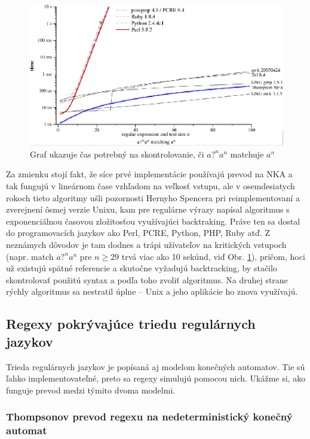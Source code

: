 \begin{figure}[h]
  \centering
  \includegraphics[width=1\textwidth]{obrazky/graf}
  \caption{Graf ukazuje čas potrebný na skontrolovanie, či $a?^na^n$ matchuje $a^n$}
  \label{fig:graf}
\end{figure}
Za zmienku stojí fakt, že síce prvé implementácie používajú prevod na NKA a tak fungujú v lineárnom čase vzhľadom na veľkosť vstupu, ale v osemdesiatych rokoch tieto algoritmy ušli pozornosti Hernyho Spencera pri reimplementovaní a zverejnení ôsmej verzie Unixu, kam pre regulárne výrazy napísal algoritmus s exponenciálnou časovou zložitosťou využívajúci backtraking. Práve ten sa dostal do programovacích jazykov ako Perl, PCRE, Python, PHP, Ruby atď. Z neznámych dôvodov je tam dodnes a trápi užívateľov na kritických vstupoch (napr. match $a?^na^n$ pre $n \geq 29$ trvá viac ako 10 sekúnd, viď Obr. \ref{fig:graf}), pričom, hoci už existujú spätné referencie a skutočne vyžadujú backtracking, by stačilo skontrolovať použitú syntax a podľa toho zvoliť algoritmus. Na druhej strane rýchly algoritmus sa nestratil úplne -- Unix a jeho aplikácie ho znova využívajú.

\subsection*{Regexy pokrývajúce triedu regulárnych jazykov}
\label{praxregex}

Trieda regulárnych jazykov je popísaná aj modelom konečných automatov. Tie sú ľahko implementovateľné, preto sa regexy simulujú pomocou nich. Ukážme si, ako funguje prevod medzi týmito dvoma modelmi.

\subsubsection{Thompsonov prevod regexu na nedeterministický konečný automat \cite{Cox07SlowPython}}

